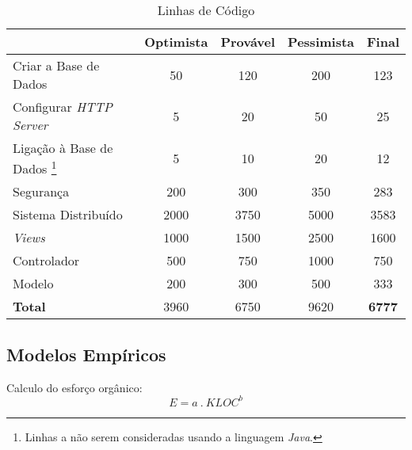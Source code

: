 \documentclass[12pt, a4paper, twoside]{report} %
\begin{document}
\begin{savenotes}
\begin{table}[h]
\centering
\begin{tabular}{|l|c c c c|}
\hline
                       					& Optimista & Provável & Pessimista & \textbf{Final} \\ \hline
Criar a Base de Dados  					& 50        & 120      & 200        & 123   		 \\ \hline
Configurar \textit{HTTP Server} 		& 5         & 20       & 50         & 25    		 \\ \hline
Ligação à Base de Dados \footnote{Linhas a não serem consideradas usando a linguagem \textit{Java}.}
										& 5         & 10       & 20         & 12    		 \\ \hline
Segurança              					& 200       & 300      & 350        & 283   		 \\ \hline
Sistema Distribuído\footnotemark	    & 2000      & 3750     & 5000       & 3583   		 \\ \hline
\textit{Views}            				& 1000      & 1500     & 2500       & 1600  		 \\ \hline
Controlador                 			& 500       & 750      & 1000       & 750   		 \\ \hline
Modelo                      			& 200       & 300      & 500        & 333   		 \\ \hline
\textbf{Total}		   					& 3960      & 6750     & 9620       & \textbf{6777}  \\ \hline
\end{tabular}
\caption{Linhas de Código}
\label{codigo}
\end{table}%
\end{savenotes}



\subsection{Modelos Empíricos}

Calculo do esforço orgânico:
\\

\begin{equation}
E = a \ . \ KLOC ^ b
\end{equation}
\end{document}
